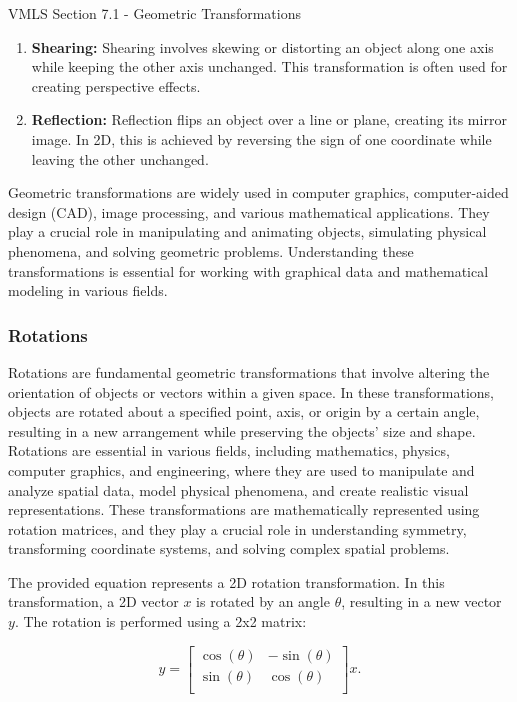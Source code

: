 \begin{notes}{VMLS Section 7.1 - Geometric Transformations}
\begin{enumerate}
        \item \textbf{Shearing:} Shearing involves skewing or distorting an object along one axis while keeping the other axis unchanged. This transformation is often used for creating perspective effects.
        
        \item \textbf{Reflection:} Reflection flips an object over a line or plane, creating its mirror image. In 2D, this is achieved by reversing the sign of one coordinate while leaving the other unchanged.
    \end{enumerate}

    Geometric transformations are widely used in computer graphics, computer-aided design (CAD), image processing, and various mathematical applications. They play a crucial role in manipulating and animating 
    objects, simulating physical phenomena, and solving geometric problems. Understanding these transformations is essential for working with graphical data and mathematical modeling in various fields.

    \subsubsection*{Rotations}

    Rotations are fundamental geometric transformations that involve altering the orientation of objects or vectors within a given space. In these transformations, objects are rotated about a specified point, 
    axis, or origin by a certain angle, resulting in a new arrangement while preserving the objects' size and shape. Rotations are essential in various fields, including mathematics, physics, computer graphics, 
    and engineering, where they are used to manipulate and analyze spatial data, model physical phenomena, and create realistic visual representations. These transformations are mathematically represented using 
    rotation matrices, and they play a crucial role in understanding symmetry, transforming coordinate systems, and solving complex spatial problems.

    \begin{Highlight}
        The provided equation represents a 2D rotation transformation. In this transformation, a 2D vector \(x\) is rotated by an angle \(\theta\), resulting in a new vector \(y\). The rotation is performed 
        using a 2x2 matrix:

        \begin{equation*}
            y =
            \begin{bmatrix}
                \cos{(\theta)} & -\sin{(\theta)} \\
                \sin{(\theta)} & \cos{(\theta)} \\
            \end{bmatrix}
            x.
        \end{equation*}


\end{Highlight}
\end{notes}
